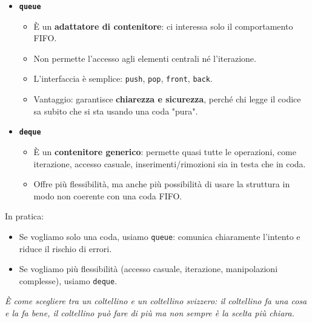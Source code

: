 \begin{itemize}
	\item \textbf{\texttt{queue}}
	\begin{itemize}
		\item È un \textbf{adattatore di contenitore}: ci interessa solo il comportamento FIFO.
		\item Non permette l'accesso agli elementi centrali né l'iterazione.
		\item L'interfaccia è semplice: \texttt{push}, \texttt{pop}, \texttt{front}, \texttt{back}.
		\item Vantaggio: garantisce \textbf{chiarezza e sicurezza}, perché chi legge il codice sa subito che si sta usando una coda "pura".
	\end{itemize}
	
	\item \textbf{\texttt{deque}}
	\begin{itemize}
		\item È un \textbf{contenitore generico}: permette quasi tutte le operazioni, come iterazione, accesso casuale, inserimenti/rimozioni sia in testa che in coda.
		\item Offre più flessibilità, ma anche più possibilità di usare la struttura in modo non coerente con una coda FIFO.
	\end{itemize}
\end{itemize}

In pratica:
\begin{itemize}
	\item Se vogliamo solo una coda, usiamo \texttt{queue}: comunica chiaramente l'intento e riduce il rischio di errori.
	\item Se vogliamo più flessibilità (accesso casuale, iterazione, manipolazioni complesse), usiamo \texttt{deque}.
\end{itemize}

\textit{È come scegliere tra un coltellino e un coltellino svizzero: il coltellino fa una cosa e la fa bene, il coltellino può fare di più ma non sempre è la scelta più chiara.}


